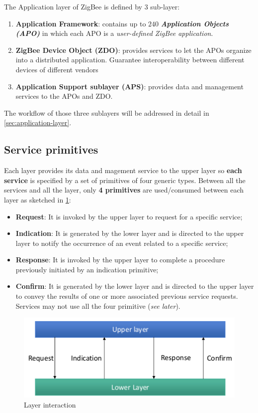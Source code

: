 \documentclass[10pt,a4paper]{report}
\theoremstyle{definition}
\begin{document}
The Application layer of ZigBee is defined by 3 sub-layer:
\begin{enumerate}
	\item 
	\textbf{Application Framework}: contains up to $240$ \textbf{\textit{Application Objects (APO)}} in which each APO is a \textit{user-defined ZigBee application}.
	\item 
	\textbf{ZigBee Device Object (ZDO)}: provides services to let the APOs organize into a distributed application. Guarantee interoperability between different devices of different vendors
	\item 
	\textbf{Application Support sublayer (APS)}: provides data and management services to the APOs and ZDO.
\end{enumerate}
The workflow of those three sublayers will be addressed in detail in \ref{sec:application-layer}.
\subsection{Service primitives}\label{sec:service-primitives}
Each layer provides its data and magement service to the upper layer so \textbf{each service} is specified by a set of primitives of four generic types.
Between all the services and all the layer, only \textbf{4 primitives} are used/consumed between each layer as sketched in \ref{4-primitives-layer}:
\begin{itemize}
	\item 
	\textbf{Request}: It is invoked by the upper layer to request for a specific service;
	\item 
	\textbf{Indication}: It is generated by the lower layer and is directed to the upper layer to notify the occurrence of an event related to a specific service;
	\item 
	\textbf{Response}: It is invoked by the upper layer to complete a procedure previously initiated by an indication primitive;
	\item 
	\textbf{Confirm}: It is generated by the lower layer and is directed to the upper layer to convey the results of one or more associated previous service requests.
	Services may not use all the four primitive (\textit{see later}).

\end{itemize}
	\begin{figure}[h]
	\centering\includegraphics[scale=0.50]{images/Pasted image 20230307163527.png}
	\caption{Layer interaction}
	\label{4-primitives-layer}
\end{figure}
\end{document}
